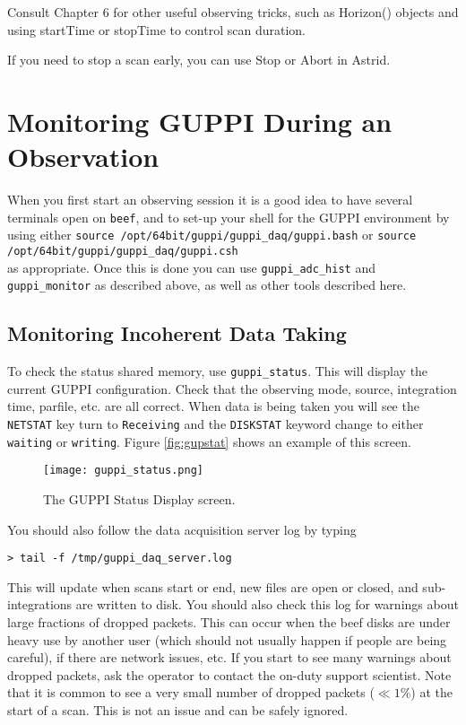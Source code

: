 Consult Chapter 6 for other useful observing tricks, such as Horizon()
objects and using startTime or stopTime to control scan duration.

If you need to stop a scan early, you can use Stop or Abort in Astrid.  

\section{Monitoring GUPPI During an Observation}
\label{sec:statusmonitor} 

When you first start an observing session it is a good idea to have
several terminals open on \texttt{beef}, and to set-up your shell for
the GUPPI environment by using either 
\hfil\break \texttt{source /opt/64bit/guppi/guppi\_daq/guppi.bash} or
\hfil\break \texttt{source /opt/64bit/guppi/guppi\_daq/guppi.csh} \\
as appropriate.  Once this is done you can use
\texttt{guppi\_adc\_hist} and \texttt{guppi\_monitor} as described
above, as well as other tools described here.

\subsection{Monitoring Incoherent Data Taking}
\label{sec:incomonitor}

To check the status shared memory, use \texttt{guppi\_status}.  This
will display the current GUPPI configuration.  Check that the
observing mode, source, integration time, parfile, etc. are all
correct.  When data is being taken you will see the \texttt{NETSTAT}
key turn to \texttt{Receiving} and the \texttt{DISKSTAT} keyword
change to either \texttt{waiting} or \texttt{writing}.  Figure
\ref{fig:gupstat} shows an example of this screen.

\begin{figure}
\texttt{[image: guppi\_status.png]}
\caption[The GUPPI status display]{The GUPPI Status Display
  screen. \label{fig:gupstat}}
\label{fig:guppistatus}
\end{figure}

You should also follow the data acquisition server log by typing
\begin{lstlisting}
> tail -f /tmp/guppi_daq_server.log
\end{lstlisting}
This will update when scans start or end, new files are open or
closed, and sub-integrations are written to disk.  You should also
check this log for warnings about large fractions of dropped packets.
This can occur when the beef disks are under heavy use by another user
(which should not usually happen if people are being careful), if
there are network issues, etc.  If you start to see many warnings
about dropped packets, ask the operator to contact the on-duty support
scientist.  Note that it is common to see a very small number of
dropped packets ($\ll 1\%$) at the start of a scan.  This is not an
issue and can be safely ignored.

